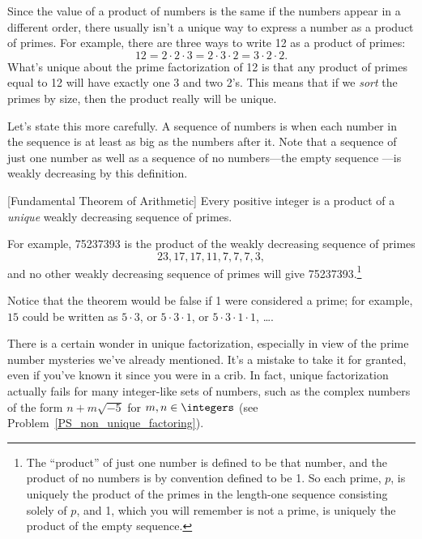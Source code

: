 Since the value of a product of numbers is the same if the numbers
appear in a different order, there usually isn't a unique way to
express a number as a product of primes.  For example, there are three
ways to write 12 as a product of primes:
\[
12 = 2 \cdot 2 \cdot 3 = 2 \cdot 3 \cdot 2 = 3 \cdot 2 \cdot 2.
\]
What's unique about the prime factorization of 12 is that any product
of primes equal to 12 will have exactly one 3 and two 2's.  This means
that if we \emph{sort} the primes by size, then the product really
will be unique.

Let's state this more carefully.  A sequence of numbers is
\emph{} when each number in the sequence is at
least as big as the numbers after it.  Note that a sequence of just
one number as well as a sequence of no numbers---the empty sequence
---is weakly decreasing by this definition.

\begin{theorem}\label{thm:unique_factor}[Fundamental Theorem of Arithmetic]
Every positive integer is a product of a \emph{unique} weakly
decreasing sequence of primes.
\end{theorem}

For example, 75237393 is the product of the weakly decreasing sequence
of primes
\[
23, 17, 17, 11, 7, 7, 7, 3,
\]
and no other weakly decreasing sequence of primes will give
75237393.\footnote{The ``product'' of just one number is defined to be
  that number, and the product of no numbers is by convention defined
  to be 1.  So each prime, $p$, is uniquely the product of the primes
  in the length-one sequence consisting solely of $p$, and 1, which you will 
  remember is not a prime, is uniquely the product of the
  empty sequence.}

Notice that the theorem would be false if 1 were considered a prime;
for example, $15$ could be written as $5 \cdot 3$, or $5 \cdot 3 \cdot
1$, or $5 \cdot 3 \cdot 1 \cdot 1$, \dots.

There is a certain wonder in unique factorization, especially in view
of the prime number mysteries we've already mentioned.  It's a mistake
to take it for granted, even if you've known it since you were in a
crib.  In fact, unique factorization actually fails for many
integer-like sets of numbers, such as the complex numbers of the
form $n + m\sqrt{-5}$ for $m,n \in \integers$ (see
Problem~\ref{PS_non_unique_factoring}).

